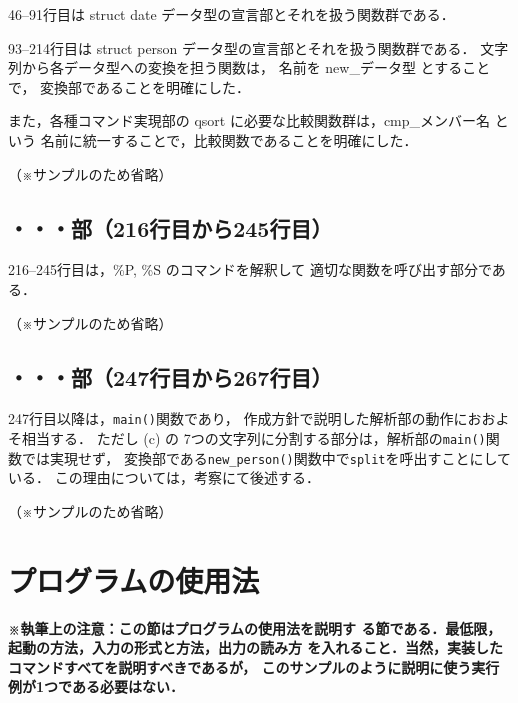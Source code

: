 \documentclass[a4j,11pt]{jarticle}
\begin{document}
46--91行目は struct date データ型の宣言部とそれを扱う関数群である．

93--214行目は struct person データ型の宣言部とそれを扱う関数群である．
文字列から各データ型への変換を担う関数は，
名前を new\_データ型 とすることで，
変換部であることを明確にした．

また，各種コマンド実現部の qsort に必要な比較関数群は，cmp\_メンバー名 という
名前に統一することで，比較関数であることを明確にした．

（※サンプルのため省略）

\subsection{・・・部（216行目から245行目）}

216--245行目は，\%P, \%S のコマンドを解釈して
適切な関数を呼び出す部分である．

（※サンプルのため省略）

\subsection{・・・部（247行目から267行目）}

247行目以降は，\verb|main()|関数であり，
作成方針で説明した解析部の動作におおよそ相当する．
ただし (c) の 7つの文字列に分割する部分は，解析部の\verb|main()|関数では実現せず，
変換部である\verb|new_person()|関数中で\verb|split|を呼出すことにしている．
この理由については，考察にて後述する．

（※サンプルのため省略）

\section{プログラムの使用法}

\textbf{\small ※執筆上の注意：この節はプログラムの使用法を説明す
    る節である．最低限，起動の方法，入力の形式と方法，出力の読み方
    を入れること．当然，実装したコマンドすべてを説明すべきであるが，
    このサンプルのように説明に使う実行例が1つである必要はない．\\}
\end{document}
